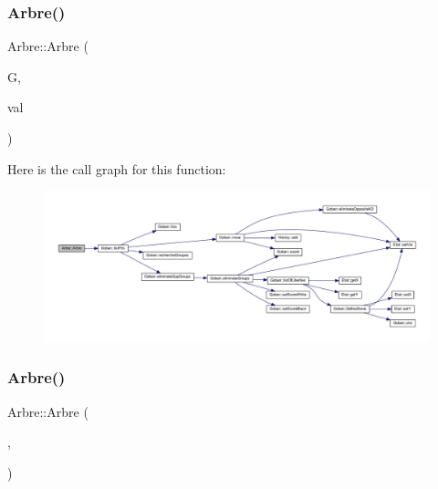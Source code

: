 \subsubsection{\texorpdfstring{Arbre()}{Arbre()}\hspace{0.1cm}{\footnotesize\ttfamily [3/5]}}
{\footnotesize\ttfamily Arbre\+::\+Arbre (\begin{DoxyParamCaption}\item[{\hyperlink{class_goban}{Goban} \&}]{G,  }\item[{\hyperlink{class_etat_af3ddb2296ffc379b7f3ad2bf832f294e}{Etat\+::\+V\+AL}}]{val }\end{DoxyParamCaption})}

Here is the call graph for this function\+:
\nopagebreak
\begin{figure}[H]
\begin{center}
\leavevmode
\includegraphics[width=350pt]{class_arbre_ac82e543d8cbf0aced4d741c346f9950d_cgraph}
\end{center}
\end{figure}
\mbox{\label{class_arbre_acaa1b2ef290ae35e414d6fc5510c9e6e}} 
\subsubsection{\texorpdfstring{Arbre()}{Arbre()}\hspace{0.1cm}{\footnotesize\ttfamily [4/5]}}
{\footnotesize\ttfamily Arbre\+::\+Arbre (\begin{DoxyParamCaption}\item[{\hyperlink{class_goban}{Goban} \&}]{,  }\item[{const size\+\_\+t}]{ }\end{DoxyParamCaption})}

\mbox{\label{class_arbre_a7be58ac146487307f93a5c141f3546df}} 
